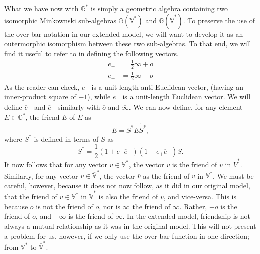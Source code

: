 \documentclass{birkjour}
\theoremstyle{definition}
\theoremstyle{remark}
\numberwithin{equation}{section}
\newcommand{\G}{\mathbb{G}}
\newcommand{\V}{\mathbb{V}}
\newcommand{\nvao}{o}
\newcommand{\nvai}{\infty}
\newcommand{\nvaob}{\overline{o}}
\newcommand{\nvaib}{\overline{\infty}}
\newcommand{\eminus}{e_{-}}
\newcommand{\eplus}{e_{+}}
\newcommand{\eminusb}{\overline{e}_{-}}
\newcommand{\eplusb}{\overline{e}_{+}}
\begin{document}
What we have now with $\G^*$ is simply a geometric algebra containing
two isomorphic Minkownski sub-algebras $\G(\V^*)$ and $\G(\overline{\V}^*)$.
To preserve the use of the over-bar notation in our extended model, we will want to develop it
as an outermorphic isomorphism between these two sub-algebras.  To that end, we will
find it useful to refer to \cite{LiRockwood} in defining the following vectors.
\begin{align}
\eminus &= \frac{1}{2}\nvai + \nvao \\
\eplus &= \frac{1}{2}\nvai - \nvao
\end{align}
As the reader can check, $\eminus$ is a unit-length anti-Euclidean vector, (having an inner-product
square of $-1$), while $\eplus$ is a unit-length Euclidean vector.  We will define
$\eminusb$ and $\eplusb$ similarly with $\nvaob$ and $\nvaib$.  We can now
define, for any element $E\in\G^*$, the friend $\overline{E}$ of $E$ as
\begin{equation}
\overline{E} = S^*E\tilde{S^*},
\end{equation}
where $S^*$ is defined in terms of $S$ as
\begin{equation}
S^* = \frac{1}{2}(1+\eminus\eminusb)(1-\eplus\eplusb)S.
\end{equation}
It now follows that for any vector $v\in\V^*$, the vector $\overline{v}$ is the
friend of $v$ in $\overline{V}^*$.  Similarly, for any vector $v\in\overline{\V}^*$,
the vector $\overline{v}$ as the friend of $v$ in $\V^*$.
We must be careful, however, because it does not now follow, as it did in our
original model, that the friend of $v\in\V^*$ in $\overline{\V}^*$ is also the
friend of $v$, and vice-versa.
This is because $\nvao$ is not the friend
of $\nvaob$, nor is $\nvai$ the friend of $\nvaib$.  Rather, $-\nvao$
is the friend of $\nvaob$, and $-\nvai$ is the friend of $\nvaib$.
In the extended model, friendship is not always a mutual relationship as it
was in the original model.
This will not present a problem for us, however, if we only use the over-bar
function in one direction; from $\V^*$ to $\overline{\V}^*$.
\end{document}
